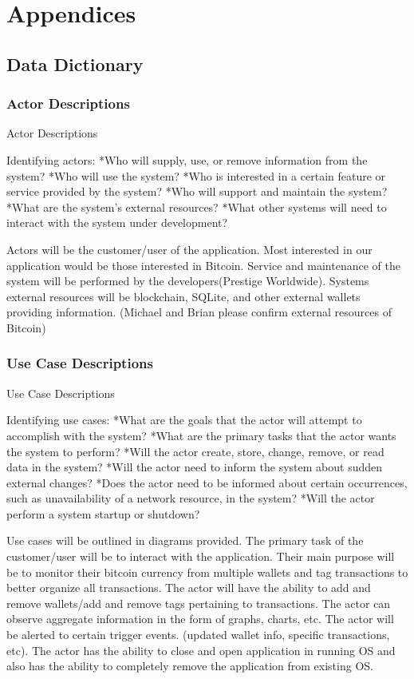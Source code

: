 \section{Appendices}
  \subsection{Data Dictionary}
    \subsubsection{Actor Descriptions}
	Actor Descriptions 

Identifying actors:
*Who will supply, use, or remove information from the system?
*Who will use the system?
*Who is interested in a certain feature or service provided by the system?
*Who will support and maintain the system?
*What are the system's external resources?
*What other systems will need to interact with the system under development?

Actors will be the customer/user of the application.  Most interested in our application would be those interested in Bitcoin. Service and maintenance of the system will be performed by the developers(Prestige Worldwide). Systems external resources will be blockchain, SQLite, and other external wallets providing information. (Michael and Brian please confirm external resources of Bitcoin)


    \subsubsection{Use Case Descriptions}
	Use Case Descriptions

Identifying use cases:
*What are the goals that the actor will attempt to accomplish with the system?
*What are the primary tasks that the actor wants the system to perform?
*Will the actor create, store, change, remove, or read data in the system?
*Will the actor need to inform the system about sudden external changes?
*Does the actor need to be informed about certain occurrences, such as unavailability of a network resource, in the system?
*Will the actor perform a system startup or shutdown?

Use cases will be outlined in diagrams provided. 
The primary task of the customer/user will be to interact with the application.  Their main purpose will be to monitor their bitcoin currency from multiple wallets and tag transactions to better organize all transactions.  The actor will have the ability to add and remove wallets/add and remove tags pertaining to transactions. The actor can observe aggregate information in the form of graphs, charts, etc.  The actor will be alerted to certain trigger events. (updated wallet info, specific transactions, etc).  The actor has the ability to close and open application in running OS and also has the ability to completely remove the application from existing OS. 
	
